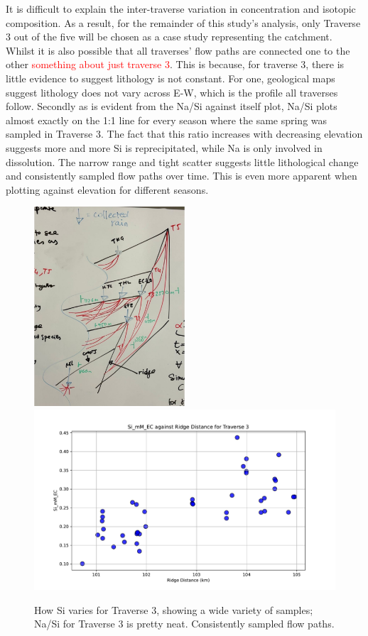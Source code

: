 It is difficult to explain the inter-traverse variation in concentration and isotopic composition. As a result, for the remainder of this study's analysis, only Traverse 3 out of the five will be chosen as a case study representing the catchment. Whilst it is also possible that all traverses' flow paths are connected one to the other \textcolor{red}{something about just traverse 3}. This is because, for traverse 3, there is little evidence to suggest lithology is not constant. For one, geological maps suggest lithology does not vary across E-W, which is the profile all traverses follow. Secondly as is evident from the Na/Si against itself plot, Na/Si plots almost exactly on the 1:1 line for every season where the same spring was sampled in Traverse 3. The fact that this ratio increases with decreasing elevation suggests more and more Si is reprecipitated, while Na is only involved in dissolution. The narrow range and tight scatter suggests little lithological change and consistently sampled flow paths over time. This is even more apparent when plotting against elevation for different seasons.

\begin{figure}[p]
    \centering
    \includegraphics[width=0.5\textwidth]{ExampleFlow.pdf}
    \includegraphics[width=\textwidth]{Si_mM_EC_Ridge_Distance.pdf}
    \caption{How Si varies for Traverse 3, showing a wide variety of samples; Na/Si for Traverse 3 is pretty neat. Consistently sampled flow paths.}
    \label{fig:spatial_changes_spring8}
\end{figure}


